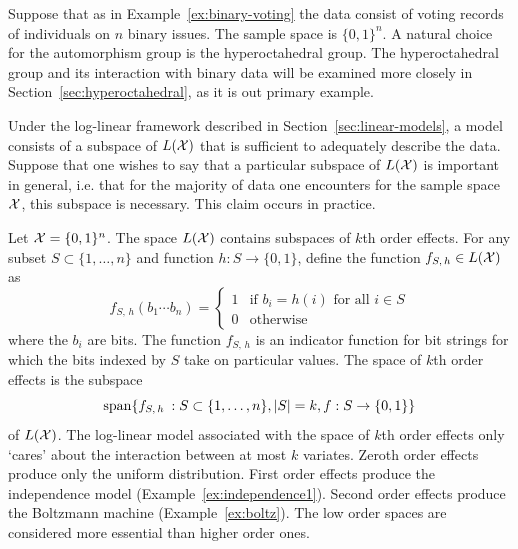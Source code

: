 \documentclass[cclicense]{hmcthesis}
\numberwithin{equation}{chapter}
\numberwithin{ucounter}{chapter}
\begin{document}
    \begin{example}
        Suppose that as in Example~\ref{ex:binary-voting} the data consist of
        voting records of individuals on $n$ binary issues.  The sample space is
        $\{0, 1\}^n$.  A natural choice for the automorphism group is the
        hyperoctahedral group.  The hyperoctahedral group and its interaction
        with binary data will be examined more closely in
        Section~\ref{sec:hyperoctahedral}, as it is out primary example.
    \end{example}
    
    Under the log-linear framework described in Section~\ref{sec:linear-models},
    a model consists of a subspace of $L(\mathcal{X})$ that is sufficient to adequately
    describe the data.  Suppose that one wishes to say that a particular
    subspace of $L(\mathcal{X})$ is important in general, i.e. that for the majority of
    data one encounters for the sample space $\mathcal{X}$, this subspace is necessary.
    This claim occurs in practice.

    \begin{example}
        Let $\mathcal{X} = \{0, 1\}^n$.  The space $L(\mathcal{X})$ contains subspaces of $k$th
        order effects.  For any subset $S \subset \{1, \ldots, n\}$ and function
        $h: S \to \{0, 1\}$, define the function $f_{S,\,h} \in L(\mathcal{X})$ as
        \[
            f_{S,\,h} (b_1 \cdots b_n) = \begin{cases}
                1 & \text{if $b_i = h(i)$ for all $i \in S$} \\
                0 & \text{otherwise}
            \end{cases}
        \]
        where the $b_i$ are bits.  The function $f_{S,\,h}$ is an indicator
        function for bit strings for which the bits indexed by $S$ take on
        particular values.  The space of $k$th order effects is the subspace
        \[
            \spanset{f_{S,\,h} \STB S \subset \{1, \ldots, n\}, |S| = 
            k, f : S \to \{0, 1\}}
        \]
        of $L(\mathcal{X})$.
        The log-linear model associated with the space of $k$th order effects
        only `cares' about the interaction between at most $k$ variates.  Zeroth
        order effects produce only the uniform distribution.  First order
        effects produce the independence model (Example~\ref{ex:independence1}).
        Second order effects produce the Boltzmann machine
        (Example~\ref{ex:boltz}).  The low order spaces are considered more
        essential than higher order ones.
    \end{example}
\end{document}
